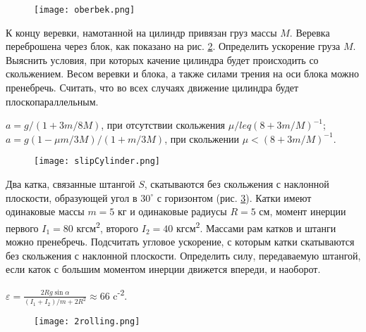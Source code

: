 \begin{figure}[h]
\centering
\texttt{[image: oberbek.png]}
\caption{}
\label{oberbek}
\end{figure}

\complexProblems

\begin{ex} %
К концу веревки, намотанной на цилиндр привязан груз массы $M$. Веревка переброшена через блок, как показано на рис. \ref{slipCylinder}. Определить ускорение груза $M$. Выяснить условия, при которых качение цилиндра будет происходить со скольжением. Весом веревки и блока, а также силами трения на оси блока можно пренебречь. Считать, что во всех случаях движение цилиндра будет плоскопараллельным.
\begin{ans}
$a = g/(1+3m/8M)$, при отсутствии скольжения $\mu /leq (8+3m/M)^{-1}$; $a = g(1 - \mu m/3M)/(1+m/3M)$, при скольжении $\mu < (8+3m/M)^{-1}$.
\end{ans}
\end{ex}	

\begin{figure}[h]
\centering
\texttt{[image: slipCylinder.png]}
\caption{}
\label{slipCylinder}
\end{figure}

\begin{ex} %
Два катка, связанные штангой $S$, скатываются без скольжения с наклонной плоскости, образующей угол в $30^{\circ}$ с горизонтом (рис. \ref{2rolling}). Катки имеют одинаковые массы $m = 5$ кг и одинаковые радиусы $R = 5$ см, момент инерции первого $I_1 = 80$ кгсм\textsuperscript{2}, второго $I_2 = 40$ кгсм\textsuperscript{2}. Массами рам катков и штанги можно пренебречь. Подсчитать угловое ускорение, с которым катки скатываются без скольжения с наклонной плоскости. Определить силу, передаваемую штангой, если каток с большим моментом инерции движется впереди, и наоборот.
\begin{ans}
$\varepsilon = \frac{2Rg \sin \alpha}{(I_1 + I_2)/m + 2R^2} \approx 66$ c\textsuperscript{-2}.
\end{ans}
\end{ex}	

\begin{figure}[h]
\centering
\texttt{[image: 2rolling.png]}
\caption{}
\label{2rolling}
\end{figure}

